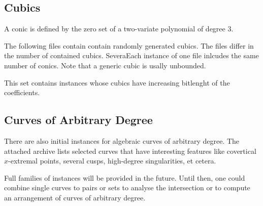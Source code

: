 \subsection{Cubics}

A conic is defined by the zero set of a two-variate polynomial
of degree 3. 

The following files contain contain randomly generated cubics. The
files differ in the number of contained cubics.
SeveraEach instance of one file inlcudes the same number of conics. Note 
that a generic cubic is usally unbounded.

This set contains instances whose cubics have increasing bitlenght of the
coefficients.


\subsection{Curves of Arbitrary Degree\label{bi_ssec:AlgebraicCurve2}}

There are also initial instances for algebraic curves of arbitrary degree.
The attached archive
lists selected curves that have interesting features like covertical 
$x$-extremal points, several cusps, high-degree singularities, et cetera.


Full families of instances will be provided in the future. Until then,
one could combine single curves to pairs or sets to analyse the intersection
or to compute an arrangement of curves of arbitrary degree.

